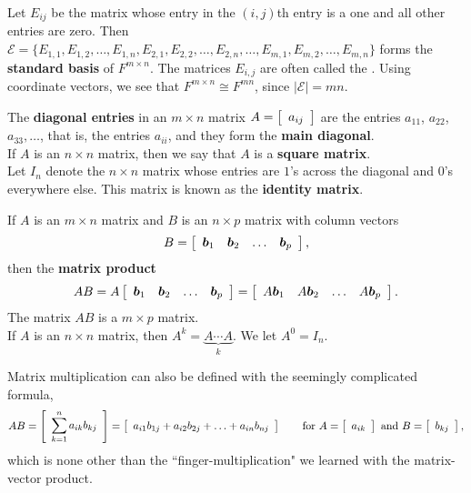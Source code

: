 Let $E_{ij}$ be the matrix whose entry in the $(i,j)$th entry is a one and all other entries are zero. Then $\mathcal{E} = \{E_{1,1}, E_{1,2}, \ldots, E_{1,n}, E_{2,1}, E_{2,2},\ldots, E_{2,n},\ldots, E_{m,1}, E_{m,2}, \ldots, E_{m,n}\}$ forms the \textbf{standard basis} of $F^{m\times n}$. The matrices $E_{i,j}$ are often called the . Using coordinate vectors, we see that $F^{m\times n} \cong F^{mn}$, since $|\mathcal{E}| = mn$.\\

\begin{Def} The \textbf{diagonal entries} in an $m\times n$ matrix $A  = \mtx{r}{a_{ij}}$ are the entries $a_{11}$, $a_{22}$, $a_{33}, \ldots$, that is, the entries $a_{ii}$, and they form the \textbf{main diagonal}.\\

If $A$ is an $n\times n$ matrix, then we say that $A$ is a \textbf{square matrix}.\\

Let $I_n$ denote the $n\times n$ matrix whose entries are $1$'s across the diagonal and $0$'s everywhere else. This matrix is known as the \textbf{identity matrix}.
\end{Def}\vs

\begin{Def} If $A$ is an $m\times n$ matrix and $B$ is an $n\times p$ matrix with column vectors 
\[B = \mtx{rrrr}{\bb b_1 & \bb b_2 & \ldots & \bb b_p},\] then the \textbf{matrix product}
\[AB = A\mtx{rrrr}{\bb b_1 & \bb b_2 & \ldots & \bb b_p} = \mtx{rrrr}{A\bb b_1 & A\bb b_2 & \ldots & A\bb b_p}.\] The matrix $AB$ is a $m\times p$ matrix.\\

If $A$ is an $n\times n$ matrix, then $A^k = \underbrace{A\cdots A}_{k}$. We let $A^0 = I_n$.
\end{Def}\vs

Matrix multiplication can also be defined with the seemingly complicated formula, 
\[AB = \mtx{r}{\dsum_{k=1}^na_{ik}b_{kj}} = \mtx{r}{a_{i1}b_{1j} + a_{i2}b_{2j} + \ldots + a_{in}b_{nj}}\qquad \text{for } A = \mtx{r}{a_{ik}} \text{ and } B= \mtx{r}{b_{kj}},\] which is none other than the ``finger-multiplication" we learned with the matrix-vector product.\\

